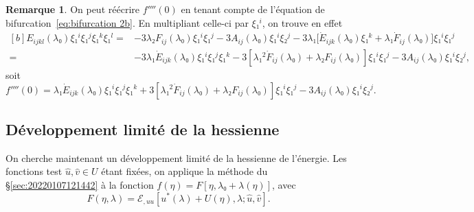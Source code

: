 \documentclass[12pt, final]{amsart}
\theoremstyle{definition}
\newtheorem{remark}{Remarque}
\begin{document}
\begin{remark}
  On peut réécrire \(f''''(0)\) en tenant compte de l'équation de
  bifurcation~\eqref{eq:bifurcation 2b}. En multipliant celle-ci par \(ξ₁^i\),
  on trouve en effet
 \begin{equation*}
   \begin{aligned}[b]
     E_{i j k l}(λ₀) ξ₁^i ξ₁^j ξ₁^k ξ₁^l
     ={} & - 3 λ₂ F_{i j}(λ₀) ξ₁^i ξ₁^j - 3 A_{i j}(λ₀) ξ₁^i ξ₂^j - 3 λ₁ \bigl[\dot{E}_{i j k} (λ₀) ξ₁^k + λ₁ \dot{F}_{i j}(λ₀)\bigr] ξ₁^i ξ₁^j\\
     ={} & - 3 λ₁ \dot{E}_{i j k}(λ₀) ξ₁^i ξ₁^j ξ₁^k - 3 [λ₁^2 \dot{F}_{i j} (λ₀) + λ₂ F_{i j}(λ₀)] ξ₁^i ξ₁^j - 3 A_{i j}(λ₀) ξ₁^i ξ₂^j,
   \end{aligned}
 \end{equation*}
 soit
 \begin{equation}
   f''''(0) = λ₁ \dot{E}_{i j k}(λ₀) ξ₁^i ξ₁^j ξ₁^k + 3 [λ₁^2 \dot{F}_{i j} (λ₀) + λ₂ F_{i j}(λ₀)] ξ₁^i ξ₁^j - 3 A_{i j}(λ₀) ξ₁^i ξ₂^j.
 \end{equation}
\end{remark}

\subsection{Développement limité de la hessienne}

On cherche maintenant un développement limité de la hessienne de l'énergie. Les
fonctions test \(\hat{u}, \hat{v} ∈ U\) étant fixées, on applique la méthode du
\S\ref{sec:20220107121442} à la fonction \(f(η) = F [η, λ₀ + λ(η)]\), avec
\begin{equation}
  F(η, λ) =ℰ_{, u u} [u^{\ast}(λ) + U(η), λ; \hat{u}, \hat{v}].
\end{equation}
\end{document}
